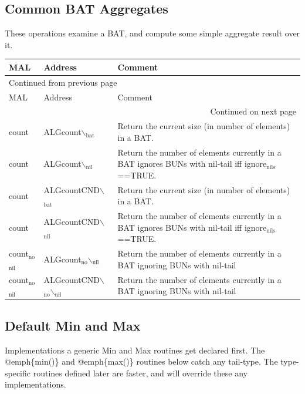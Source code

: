 \documentclass[11pt]{article}
\begin{document}
\subsection{Common BAT Aggregates}
\label{sec:orga96876a}
These operations examine a BAT, and compute some simple aggregate result over it.
\begin{longtable}{|l|l|p{10cm}|}
\hline
MAL & Address & Comment\\
\hline
\endfirsthead
\multicolumn{3}{l}{Continued from previous page} \\
\hline

MAL & Address & Comment \\

\hline
\endhead
\hline\multicolumn{3}{r}{Continued on next page} \\
\endfoot
\endlastfoot
\hline
count & ALGcount$\backslash$\(_{\text{bat}}\) & Return the current size (in number of elements) in a BAT.\\
\hline
count & ALGcount$\backslash$\(_{\text{nil}}\) & Return the number of elements currently in a BAT ignores BUNs with nil-tail iff ignore\(_{\text{nils}}\)==TRUE.\\
\hline
count & ALGcountCND$\backslash$\(_{\text{bat}}\) & Return the current size (in number of elements) in a BAT.\\
\hline
count & ALGcountCND$\backslash$\(_{\text{nil}}\) & Return the number of elements currently in a BAT ignores BUNs with nil-tail iff ignore\(_{\text{nils}}\)==TRUE.\\
\hline
count\(_{\text{no}}\)\(_{\text{nil}}\) & ALGcount\(_{\text{no}}\)$\backslash$\(_{\text{nil}}\) & Return the number of elements currently	in a BAT ignoring BUNs with nil-tail\\
\hline
count\(_{\text{no}}\)\(_{\text{nil}}\) & ALGcountCND$\backslash$\(_{\text{no}}\)$\backslash$\(_{\text{nil}}\) & Return the number of elements currently	in a BAT ignoring BUNs with nil-tail\\
\hline
\end{longtable}

\subsection{Default Min and Max}
\label{sec:orgd4d27d0}
Implementations a generic Min and Max routines get declared first. The @emph\{min()\} and @emph\{max()\} routines below catch any tail-type.
The type-specific routines defined later are faster, and will override these any implementations.
\end{document}
